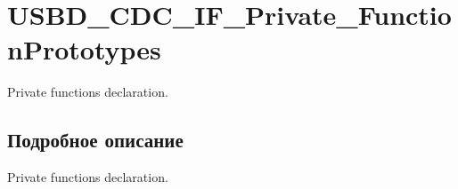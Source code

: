 \hypertarget{group___u_s_b_d___c_d_c___i_f___private___function_prototypes}{
\section{USBD\_\-CDC\_\-IF\_\-Private\_\-FunctionPrototypes}
\label{group___u_s_b_d___c_d_c___i_f___private___function_prototypes}
}
Private functions declaration.  




\subsection{Подробное описание}
Private functions declaration. 